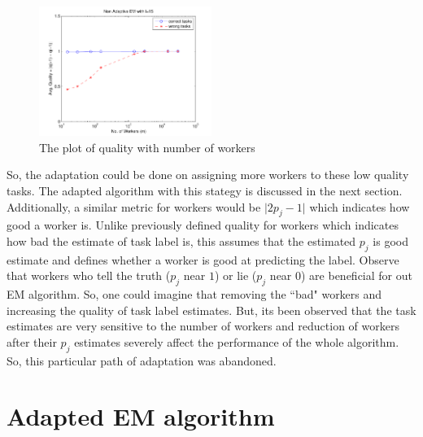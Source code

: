 \documentclass[10pt]{article}
\begin{document}
\begin{figure}[h!]
	\centering
	\includegraphics[width=0.5\textwidth]{quality_diff2.pdf}
	\caption{The plot of quality with number of workers}
	\label{quality_plot}
\end{figure}

So, the adaptation could be done on assigning more workers to these low quality tasks. The adapted algorithm with this stategy is discussed in the next section. Additionally, a similar metric for workers would be $\vert2p_j - 1 \vert$ which indicates how good a worker is. Unlike previously defined quality for workers which indicates how bad the estimate of task label is, this assumes that the estimated $p_j$ is good estimate and defines whether a worker is good at predicting the label. Observe that workers who tell the truth ($p_j$ near $1$) or lie ($p_j$ near $0$) are beneficial for out EM algorithm. So, one could imagine that removing the ``bad" workers and increasing the quality of task label estimates. But, its been observed that the task estimates are very sensitive to the number of workers and reduction of workers after their $p_j$ estimates severely affect the performance of the whole algorithm. So, this particular path of adaptation was abandoned.

\section{Adapted EM algorithm}
\end{document}
